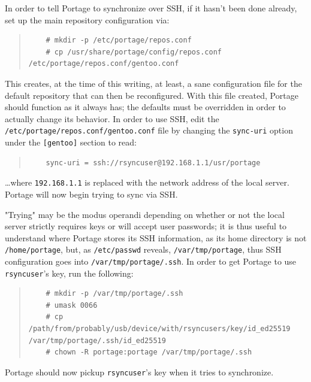 \documentclass{article}
\begin{document}
In order to tell Portage to synchronize over SSH, if it hasn't been done already, set up the main repository configuration via:
\begin{quote}
\begin{verbatim}
	# mkdir -p /etc/portage/repos.conf
	# cp /usr/share/portage/config/repos.conf /etc/portage/repos.conf/gentoo.conf
\end{verbatim}
\end{quote}
This creates, at the time of this writing, at least, a sane configuration file for the default repository that can then be reconfigured.  With this file created, Portage should function as it always has; the defaults must be overridden in order to actually change its behavior. In order to use SSH, edit the \texttt{/etc/portage/repos.conf/gentoo.conf} file by changing the \texttt{sync-uri} option under the \texttt{[gentoo]} section to read:
\begin{quote}
\begin{verbatim}
	sync-uri = ssh://rsyncuser@192.168.1.1/usr/portage
\end{verbatim}
\end{quote}
\ldots where \texttt{192.168.1.1} is replaced with the network address of the local server.  Portage will now begin trying to sync via SSH.

"Trying" may be the modus operandi depending on whether or not the local server strictly requires keys or will accept user passwords; it is thus useful to understand where Portage stores its SSH information, as its home directory is not \texttt{/home/portage}, but, as \texttt{/etc/passwd} reveals, \texttt{/var/tmp/portage}, thus SSH configuration goes into \texttt{/var/tmp/portage/.ssh}.  In order to get Portage to use \texttt{rsyncuser}'s key, run the following:
\begin{quote}
\begin{verbatim}
	# mkdir -p /var/tmp/portage/.ssh
	# umask 0066
	# cp /path/from/probably/usb/device/with/rsyncusers/key/id_ed25519 /var/tmp/portage/.ssh/id_ed25519
	# chown -R portage:portage /var/tmp/portage/.ssh
\end{verbatim}
\end{quote}
Portage should now pickup \texttt{rsyncuser}'s key when it tries to synchronize.
\end{document}
